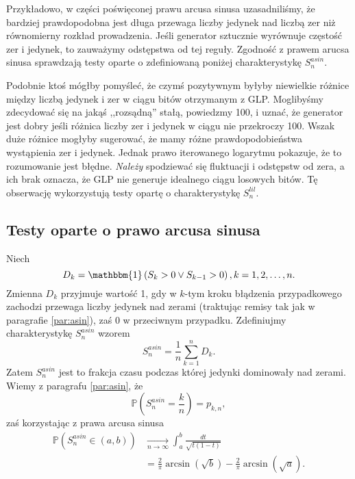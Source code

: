 \documentclass[a4paper,11pt,twoside]{book}
\newcommand{\Pro}[1]{\mathbb{P}\left(#1\right)}
\newcommand{\conv}{\rightarrow}
\newcommand{\Slil}[1]{S^{lil}_#1}
\newcommand{\Sasin}[1]{S^{asin}_#1}
\theoremstyle{definition}
\begin{document}
Przykładowo, w części poświęconej prawu arcusa sinusa uzasadniliśmy, że bardziej prawdopodobna jest długa przewaga liczby jedynek nad liczbą zer niż równomierny rozkład prowadzenia. Jeśli generator sztucznie wyrównuje częstość zer i jedynek, to zauważymy odstępstwa od tej reguły. Zgodność z prawem arucsa sinusa sprawdzają testy oparte o zdefiniowaną poniżej charakterystykę $\Sasin{n}$.

Podobnie ktoś mógłby pomyśleć, że czymś pozytywnym byłyby niewielkie różnice między liczbą jedynek i zer w ciągu bitów otrzymanym z GLP. Moglibyśmy zdecydować się na jakąś ,,rozsądną'' stałą, powiedzmy 100, i uznać, że generator jest dobry jeśli różnica liczby zer i jedynek w ciągu nie przekroczy 100. Wszak duże różnice mogłyby sugerować, że mamy różne prawdopodobieństwa wystąpienia zer i jedynek. Jednak prawo iterowanego logarytmu pokazuje, że to rozumowanie jest błędne. \emph{Należy} spodziewać się fluktuacji i odstępstw od zera, a ich brak oznacza, że GLP nie generuje idealnego ciągu losowych bitów. Tę obserwację wykorzystują testy opartę o charakterystykę $\Slil{n}$.


\subsection{Testy oparte o prawo arcusa sinusa}
Niech
\begin{equation}
D_k = \mathbbm{1}\left(S_k > 0 \vee S_{k-1}>0 \right), k=1,2,\ldots,n.
\end{equation}
Zmienna $D_k$ przyjmuje wartość 1, gdy w $k$-tym kroku błądzenia przypadkowego zachodzi przewaga liczby jedynek nad zerami (traktując remisy tak jak w paragrafie \ref{par:asin}), zaś 0 w przeciwnym przypadku. Zdefiniujmy charakterystykę $\Sasin{n}$ wzorem
\begin{equation}
 \Sasin{n} = \frac{1}{n} \sum_{k=1}^n D_k.
\end{equation}
Zatem $\Sasin{n}$ jest to frakcja czasu podczas której jedynki dominowały nad zerami. Wiemy z paragrafu \ref{par:asin}, że
\[ \Pro{\Sasin{n} = \frac{k}{n}} = p_{k,n}, \]
zaś korzystając z prawa arcusa sinusa
\begin{equation}
\begin{split}
 \label{eq:prob_sasin}
  \Pro{\Sasin{n} \in (a,b)} &\xrightarrow[n \conv \infty]{} \int_a^b \frac{dt}{\sqrt{t(1-t)}}\\
  &= \frac{2}{\pi}\arcsin(\sqrt{b}) - \frac{2}{\pi}\arcsin(\sqrt{a}).
\end{split}
\end{equation}
\end{document}
